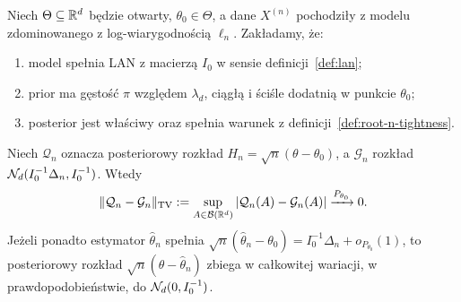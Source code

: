 \begin{twierdzenie}
\label{thm:bvm-under-lan}
Niech $\Theta\subseteq\mathbb R^d$ będzie otwarty,
$\theta_0\in\Theta$, a dane $X^{(n)}$ pochodziły z
modelu zdominowanego z log-wiarygodnością $\ell_n$.
Zakładamy, że:
\begin{enumerate}
\item model spełnia LAN z macierzą $I_0$ w sensie
definicji~\ref{def:lan};
\item prior ma gęstość $\pi$ względem $\lambda_d$,
ciągłą i ściśle dodatnią w punkcie $\theta_0$;
\item posterior jest właściwy oraz spełnia warunek
z definicji~\ref{def:root-n-tightness}.
\end{enumerate}
Niech $\mathcal Q_n$ oznacza posteriorowy rozkład
$H_n=\sqrt n(\theta-\theta_0)$, a $\mathcal G_n$
rozkład $\mathcal N_d(I_0^{-1}\Delta_n,I_0^{-1})$.
Wtedy
\[
 \lVert\mathcal Q_n-\mathcal G_n\rVert_{\rm TV}
 :=\sup_{A\in\mathcal B(\mathbb R^d)}|\mathcal Q_n(A)-\mathcal G_n(A)|
 \xrightarrow{P_{\theta_0}}0.
\]
Jeżeli ponadto estymator $\widehat\theta_n$ spełnia
$\sqrt n(\widehat\theta_n-\theta_0)=I_0^{-1}\Delta_n+o_{P_{\theta_0}}(1)$,
to posteriorowy rozkład
$\sqrt n(\theta-\widehat\theta_n)$ zbiega w całkowitej
wariacji, w prawdopodobieństwie, do $\mathcal N_d(0,I_0^{-1})$.
\end{twierdzenie}

